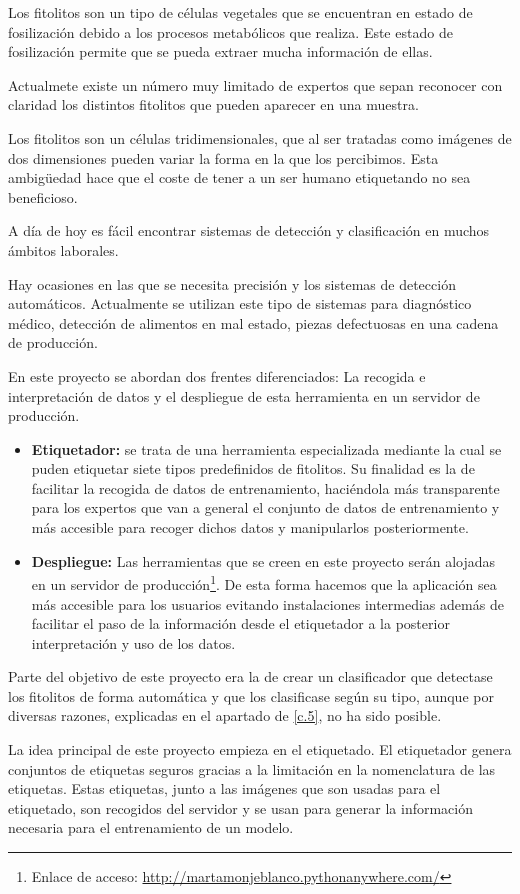 Los fitolitos son un tipo de células vegetales que se encuentran en estado de fosilización debido a los procesos metabólicos que realiza. Este estado de fosilización permite que se pueda extraer mucha información de ellas.

Actualmete existe un número muy limitado de expertos que sepan reconocer con claridad los distintos fitolitos que pueden aparecer en una muestra.

Los fitolitos son un células tridimensionales, que al ser tratadas como imágenes de dos dimensiones pueden variar la forma en la que los percibimos. Esta ambigüedad hace que el coste de tener a un ser humano etiquetando no sea beneficioso.

A día de hoy es fácil encontrar sistemas de detección y clasificación en muchos ámbitos laborales.

Hay ocasiones en las que se necesita precisión y los sistemas de detección automáticos. Actualmente se utilizan este tipo de sistemas para diagnóstico médico, detección de alimentos en mal estado, piezas defectuosas en una cadena de producción.

En este proyecto se abordan dos frentes diferenciados: La recogida e interpretación de datos y el despliegue de esta herramienta en un servidor de producción. 
\begin{itemize}
	\item \textbf{Etiquetador:} se trata de una herramienta especializada mediante la cual se puden etiquetar siete tipos predefinidos de fitolitos. Su finalidad es la de facilitar la recogida de datos de entrenamiento, haciéndola más transparente para los expertos que van a general el conjunto de datos de entrenamiento y más accesible para recoger dichos datos y manipularlos posteriormente.

	\item \textbf{Despliegue:} Las herramientas que se creen en este proyecto serán alojadas en un servidor de producción\footnote{Enlace de acceso: \url{http://martamonjeblanco.pythonanywhere.com/}}. 
	De esta forma hacemos que la aplicación sea más accesible para los usuarios	evitando instalaciones intermedias además de facilitar el paso de la información desde el etiquetador a la posterior interpretación y uso de los datos.
	
\end{itemize}

Parte del objetivo de este proyecto era la de crear un clasificador que detectase los fitolitos de forma automática y que los clasificase según su tipo, aunque por diversas razones, explicadas en el apartado de \ref{c.5}, no ha sido posible.

 La idea principal de este proyecto empieza en el etiquetado. El etiquetador genera conjuntos de etiquetas seguros gracias a la limitación en la nomenclatura de las etiquetas. Estas etiquetas, junto a las imágenes que son usadas para el etiquetado, son recogidos del servidor y se usan para generar la información necesaria para el entrenamiento de un modelo.

